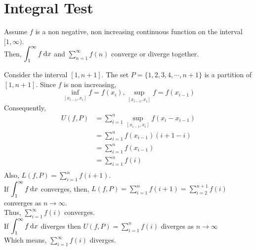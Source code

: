\documentclass[12pt]{article}
\begin{document}
\section{Integral Test}
\begin{theo}{}
Assume \(f\) is a non negative, non increasing continuous function on the interval \([1, \infty)\).\\
Then, \(\displaystyle\int_{1}^\infty f \,\mathrm{d} x\) and \(\displaystyle\sum_{n=1}^\infty f(n)\) converge or diverge together.\\     
\end{theo}
\newpage
\begin{prf}{}
Consider the interval \([1, n+1]\). The set \(P = \{1, 2, 3, 4, \cdots , n+1\}\) is a partition of \([1, n+1]\). Since \(f\) is non increasing,
\[\displaystyle\inf_{[x_{i-1}, x_i]} f = f(x_i), \sup_{[x_{i-1},x_i]} f = f(x_{i-1})\]
Consequently,
\begin{align*}
    U(f,P) &= \displaystyle\sum_{i=1}^n \sup_{[x_{i-1}, x_i]} f(x_i - x_{i-1})\\
    &= \displaystyle\sum_{i=1}^n f(x_{i-1})(i+1-i)\\
    &= \displaystyle\sum_{i=1}^n f(x_{i-1})\\
    &= \displaystyle\sum_{i=1}^n f(i)\\
\end{align*}
Also, \(L(f,P) = \displaystyle\sum_{i=1}^n f(i+1)\).\\
If \(\displaystyle\int_1^\infty f \,\mathrm{d} x\) converges, then, \(L(f, P) = \displaystyle\sum_{i=1}^n f(i+1) = \displaystyle\sum_{i=2}^{n+1}f(i)\) converges as \(n\to\infty\).\\
Thus, \(\displaystyle\sum_{i=1}^\infty f(i)\) converges.\\
If \(\displaystyle\int_1^\infty f \,\mathrm{d} x\) diverges then \(U(f,P) = \displaystyle\sum_{i=1}^n f(i)\) diverges as \(n\to\infty\)\\
Which means, \(\displaystyle\sum_{i=1}^\infty f(i)\) diverges.  
\end{prf}
\end{document}
